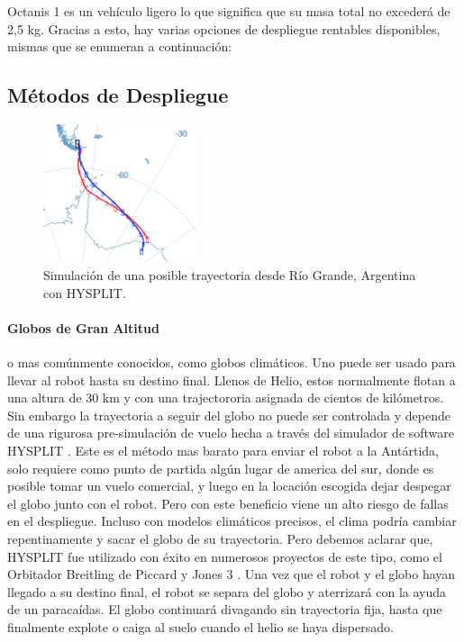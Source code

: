 \documentclass[a4paper,12pt]{article}
\begin{document}
Octanis 1 es un vehículo ligero lo que significa que su masa total no excederá de 2,5 kg. Gracias a esto, hay varias opciones de despliegue rentables disponibles, mismas que se enumeran a continuación:

\subsection{Métodos de Despliegue}

\begin{figure}[h!]
	\centering
    \includegraphics[width=0.4\textwidth]{trajectory}
    \caption{Simulación de una posible trayectoria desde Río Grande, Argentina con HYSPLIT.}
\end{figure}

\paragraph{Globos de Gran Altitud} o mas comúnmente conocidos, como globos climáticos. Uno puede ser usado para llevar al robot hasta su destino final. Llenos de Helio, estos normalmente flotan a una altura de 30 km y con una trajectororia asignada de cientos de kilómetros. Sin embargo la trayectoria a seguir del globo no puede ser controlada y depende de una rigurosa pre-simulación de vuelo hecha a través del simulador de software HYSPLIT  \cite{hysplit} \cite{hysplitjava}. Este es el método mas barato para enviar el robot a la Antártida, solo requiere como punto de partida algún lugar de america del sur, donde es posible tomar un vuelo comercial, y luego en la locación escogida dejar despegar el globo junto con el robot. Pero con este beneficio viene un alto riesgo de fallas en el despliegue. Incluso con modelos climáticos precisos, el clima podría cambiar repentinamente y sacar el globo de su trayectoria. Pero debemos aclarar que, HYSPLIT fue utilizado con éxito en numerosos proyectos de este tipo, como  el Orbitador Breitling de Piccard y Jones 3 \cite{hysplitexamples}.
Una vez que el robot y el globo hayan llegado a su destino final, el robot se separa del globo y aterrizará con la ayuda de un paracaídas. El globo continuará divagando sin trayectoria fija, hasta que finalmente explote o caiga al suelo cuando el helio se haya dispersado.
\end{document}
